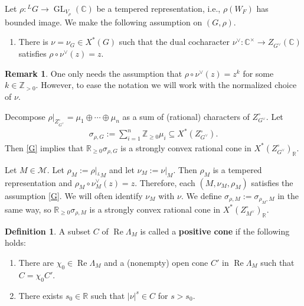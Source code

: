 \documentclass[10pt]{amsart}
\theoremstyle{definition}
\newtheorem{remark}[theorem]{Remark}
\newtheorem{definition}[theorem]{Definition}
\numberwithin{equation}{section}
\DeclareMathOperator{\GL}{\mathrm{GL}}
\numberwithin{equation}{subsection}
\newcommand{\ZZ}{\mathbb{Z}}
\newcommand{\CC}{\mathbb{C}}
\renewcommand{\Re}{\mathop{\mathrm{Re}}}
\begin{document}
Let $\rho:{}^LG\longrightarrow \GL_{V_\rho}(\mathbb{C})$ be a tempered representation, i.e., $\rho(W_F)$ has bounded image. We make the following assumption on $(G,\rho)$.
\begin{enumerate}[label=(G), ref=G]
    \item \label{G}
    There is $\nu=\nu_G\in X^\ast(G)$ such that the dual cocharacter $\nu^\lor:\CC^\times \longrightarrow Z_{G^\vee}(\CC)$ satisfies $\rho\circ \nu^\lor(z)=z$.
\end{enumerate}

\begin{remark}\label{rem:relaxation}
    One only needs the assumption that $\rho\circ \nu^\lor(z)=z^k$ for some $k\in \ZZ_{>0}.$ However, to ease the notation we will work with the normalized choice of $\nu$.
\end{remark}

    Decompose  $\rho\vert_{Z_{G^\vee}^\circ} =\mu_1\oplus\cdots\oplus\mu_n$ as a sum of (rational) characters of $Z_{G^\vee}^\circ$. Let 
\begin{align*}
\sigma_{\rho,G} := \sum_{i=1}^n \mathbb{Z}_{\geq 0}\mu_i\subseteq X^*(Z_{G^\vee}^\circ).
\end{align*}
Then \eqref{G} implies that $\mathbb{R}_{\geq 0}\sigma_{\rho,G}$ is a strongly convex rational cone in $X^*(Z_{G^\vee}^\circ)_{\mathbb{R}}$. 



Let $M\in \mathcal{M}.$ Let $\rho_M := \rho\vert_{{}^LM}$ and let $\nu_M:=\nu\vert_{M}$. Then $\rho_M$ is a tempered representation and $\rho_M\circ \nu_M^\lor(z)=z$. Therefore, each $(M,\nu_M,\rho_M)$ satisfies the assumption \eqref{G}. We will often identify $\nu_M$ with $\nu$. We define $\sigma_{\rho,M}:=\sigma_{\rho_M,M}$ in the same way, so $\mathbb{R}_{\geq 0}\sigma_{\rho,M}$ is a strongly convex rational cone in $X^*(Z_{M^\vee}^\circ)_{\mathbb{R}}$.

\begin{definition}\label{def:positivecone}
    A subset $C$ of $\Re\Lambda_M$ is called a \textbf{positive cone} if the following holds:
\begin{enumerate}
    \item [(C1)] There are $\chi_0\in \Re\Lambda_M$ and a (nonempty) open cone $C'$ in $\Re\Lambda_M$ such that $C=\chi_0C'$.
    \item [(C2)] There exists $s_0\in\mathbb{R}$ such that $|\nu|^{s}\in C$ for $s>s_0$.
\end{enumerate}

\end{definition}
\end{document}
